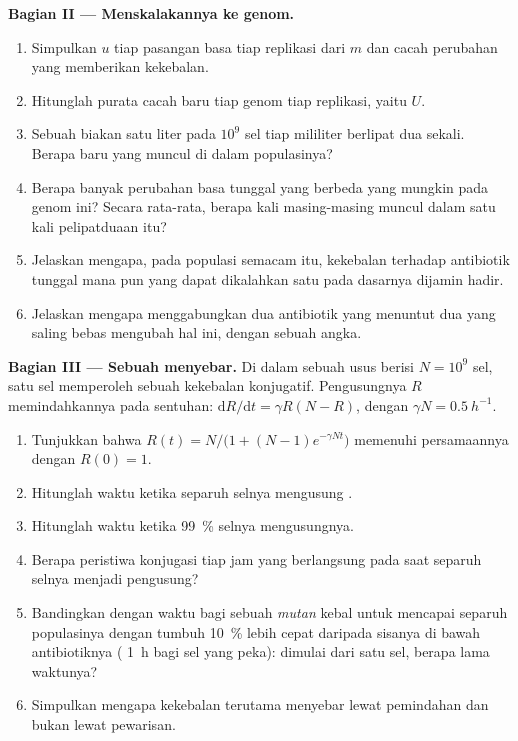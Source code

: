 \begin{problem}
\medskip
\noindent\textbf{Bagian II --- Menskalakannya ke genom.}
\begin{enumerate}[resume]
  \item Simpulkan  $u$ tiap pasangan basa tiap replikasi
        dari $m$ dan cacah perubahan yang memberikan kekebalan.
  \item Hitunglah purata cacah  baru tiap genom tiap
        replikasi, yaitu $U$.
  \item Sebuah biakan satu liter pada $10^{9}$ sel tiap mililiter
        berlipat dua sekali. Berapa  baru yang muncul di dalam
        populasinya?
  \item Berapa banyak perubahan basa tunggal yang berbeda yang mungkin
        pada genom ini? Secara rata-rata, berapa kali masing-masing
        muncul dalam satu kali pelipatduaan itu?
  \item Jelaskan mengapa, pada populasi semacam itu, kekebalan terhadap
        antibiotik tunggal mana pun yang dapat dikalahkan satu 
        pada dasarnya dijamin hadir.
  \item Jelaskan mengapa menggabungkan dua antibiotik yang menuntut dua
         yang saling bebas mengubah hal ini, dengan sebuah angka.
\end{enumerate}

\medskip
\noindent\textbf{Bagian III --- Sebuah  menyebar.}
Di dalam sebuah usus berisi $N = 10^{9}$ sel, satu sel memperoleh
sebuah  kekebalan konjugatif. Pengusungnya $R$ memindahkannya
pada sentuhan: $\mathrm{d}R/\mathrm{d}t = \gamma R(N - R)$, dengan $\gamma N =
\qty{0.5}{h^{-1}}$.
\begin{enumerate}[resume]
  \item Tunjukkan bahwa $R(t) = N/\bigl(1 + (N - 1)e^{-\gamma N t}\bigr)$
        memenuhi persamaannya dengan $R(0) = 1$.
  \item Hitunglah waktu ketika separuh selnya mengusung .
  \item Hitunglah waktu ketika \qty{99}{\%} selnya mengusungnya.
  \item Berapa peristiwa konjugasi tiap jam yang berlangsung pada saat
        separuh selnya menjadi pengusung?
  \item Bandingkan dengan waktu bagi sebuah \emph{mutan} kebal untuk
        mencapai separuh populasinya dengan tumbuh \qty{10}{\%} lebih
        cepat daripada sisanya di bawah antibiotiknya (
        \qty{1}{h} bagi sel yang peka): dimulai dari satu sel, berapa
        lama waktunya?
  \item Simpulkan mengapa kekebalan terutama menyebar lewat pemindahan
        dan bukan lewat pewarisan.
\end{enumerate}


\end{problem}
